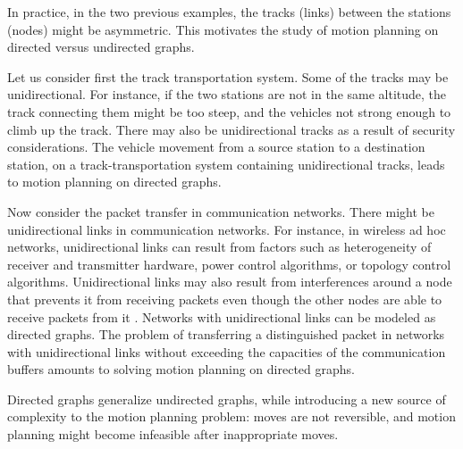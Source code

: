 \documentclass{article}
\begin{document}
In practice, in the two previous examples, the tracks (links)
between the stations (nodes) might be asymmetric. This motivates the
study of motion planning on directed versus undirected graphs.

Let us consider first the track transportation system. Some of the
tracks may be unidirectional. For instance, if the two stations are
not in the same altitude, the track connecting them might be too
steep, and the vehicles not strong enough to climb up the track.
There may also be unidirectional tracks as a result of security
considerations. The vehicle movement from a source station to a
destination station, on a track-transportation system containing
unidirectional tracks, leads to motion planning on directed graphs.

Now consider the packet transfer in communication networks. There
might be unidirectional links in communication networks. For
instance, in wireless ad hoc networks, unidirectional links can
result from factors such as heterogeneity of receiver and
transmitter hardware, power control algorithms, or topology control
algorithms. Unidirectional links may also result from interferences
around a node that prevents it from receiving packets even though
the other nodes are able to receive packets from it
\cite{MD02,JetchevaJ06}. Networks with unidirectional links can be
modeled as directed graphs. The problem of transferring a
distinguished packet in networks with unidirectional links without
exceeding the capacities of the communication buffers amounts to
solving motion planning on directed graphs.

Directed graphs generalize undirected graphs, while introducing a
new source of complexity to the motion planning problem: moves are
not reversible, and motion planning might become infeasible after
inappropriate moves.
\end{document}
